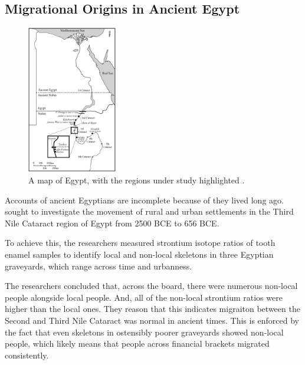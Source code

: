 \documentclass[a4paper, 12pt]{article}
\begin{document}
\subsection{Migrational Origins in Ancient Egypt}
\begin{figure}[ht]
    \centering
    \includegraphics[width=0.35\textwidth]{egypt_regions.jpg}
    \caption{A map of Egypt, with the regions under study highlighted \citep{schrader2019}. }
    \label{fig:egypt_regions}
\end{figure}

Accounts of ancient Egyptians are incomplete because of they lived long ago.
\cite{schrader2019} sought to investigate the movement of rural and urban settlements
in the Third Nile Cataract region of Egypt from 2500 BCE to 656 BCE.

To achieve this, the researchers measured strontium isotope ratios of tooth enamel samples to
identify local and non-local skeletons in three Egyptian graveyards, which range
across time and urbanness.

The researchers concluded that, across the board, there were numerous non-local
people alongside local people. And, all of the non-local strontium ratios were higher than the local ones.
They reason that this indicates migraiton between the Second and Third
Nile Cataract was normal in ancient times. This is enforced by the fact that
even skeletons in ostensibly poorer graveyards showed non-local people, which likely
means that people across financial brackets migrated consistently.

\end{document}
